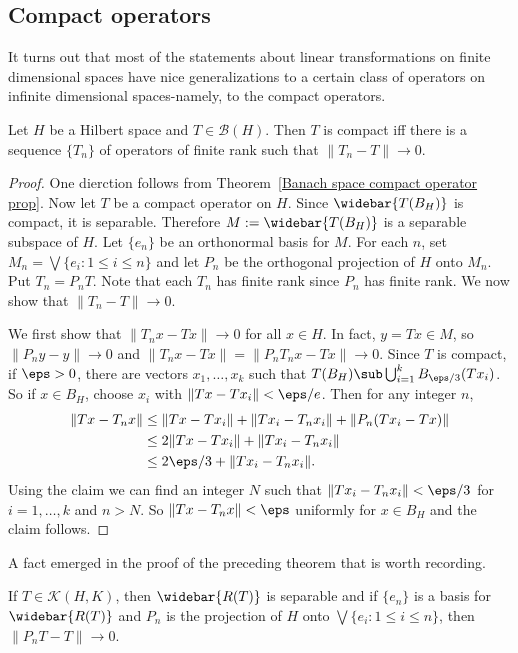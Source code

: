 \subsection{Compact operators}
It turns out that most of the statements about linear transformations on finite dimensional spaces have nice generalizations to a certain class of operators on infinite dimensional spaces-namely, to the compact operators.
\begin{theorem}
Let $H$ be a Hilbert space and $T\in\mathcal{B}(H)$. Then $T$ is compact iff there is a sequence $\{T_n\}$ of operators of finite rank such that $\|T_n-T\|\to 0$.
\end{theorem}
\begin{proof}
One dierction follows from Theorem~\ref{Banach space compact operator prop}. Now let $T$ be a compact operator on $H$. Since $\widebar{T(B_H)}$ is compact, it is separable. Therefore $M:=\widebar{T(B_H)}$ is a separable subspace of $H$. Let $\{e_n\}$ be an orthonormal basis for $M$. For each $n$, set $M_n=\bigvee\{e_i:1\leq i\leq n\}$ and let $P_n$ be the orthogonal projection of $H$ onto $M_n$. Put $T_n=P_nT$. Note that each $T_n$ has finite rank since $P_n$ has finite rank. We now show that $\|T_n-T\|\to 0$.\par
We first show that $\|T_nx-Tx\|\to 0$ for all $x\in H$. In fact, $y=Tx\in M$, so $\|P_ny-y\|\to 0$ and $\|T_nx-Tx\|=\|P_nT_nx-Tx\|\to 0$. Since $T$ is compact, if $\eps>0$, there are vectors $x_1,\dots,x_k$ such that $T(B_H)\sub\bigcup_{i=1}^{k}B_{\eps/3}(Tx_i)$. So if $x\in B_H$, choose $x_i$ with $\|Tx-Tx_i\|<\eps/e$. Then for any integer $n$,
\begin{align*}
\|Tx-T_nx\|&\leq\|Tx-Tx_i\|+\|Tx_i-T_nx_i\|+\|P_n(Tx_i-Tx)\|\\
&\leq 2\|Tx-Tx_i\|+\|Tx_i-T_nx_i\|\\
&\leq 2\eps/3+\|Tx_i-T_nx_i\|.
\end{align*}
Using the claim we can find an integer $N$ such that $\|Tx_i-T_nx_i\|<\eps/3$ for $i=1,\dots,k$ and $n>N$. So $\|Tx-T_nx\|<\eps$ uniformly for $x\in B_H$ and the claim follows.
\end{proof}
A fact emerged in the proof of the preceding theorem that is worth recording.
\begin{corollary}\label{Hilbert space compact operator image separable}
If $T\in\mathcal{K}(H,K)$, then $\widebar{R(T)}$ is separable and if $\{e_n\}$ is a basis for $\widebar{R(T)}$ and $P_n$ is the projection of $H$ onto $\bigvee\{e_i:1\leq i\leq n\}$, then $\|P_nT-T\|\to 0$.
\end{corollary}
